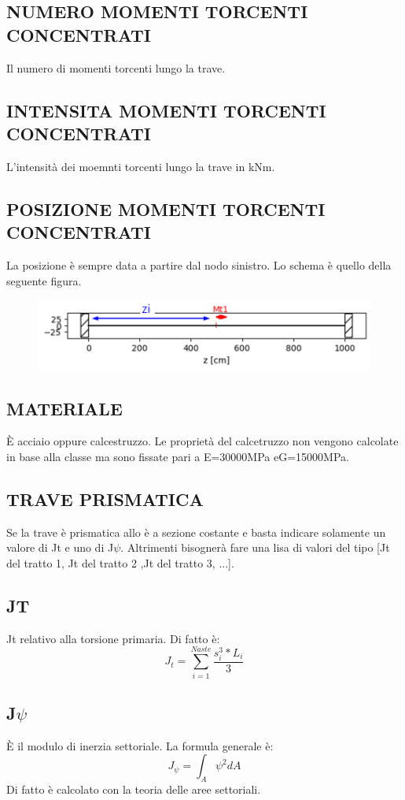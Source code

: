 \documentclass[12pt  , a4, titlepage]{article}
\newcommand{\E}{\`E }
\begin{document}
	\subsection*{NUMERO MOMENTI TORCENTI CONCENTRATI}
	Il numero di momenti torcenti lungo la trave.
	\subsection*{INTENSITA MOMENTI TORCENTI CONCENTRATI}
	L'intensità dei moemnti torcenti lungo la trave in kNm.
	\subsection*{POSIZIONE MOMENTI TORCENTI CONCENTRATI}
		La posizione è sempre data a partire dal nodo sinistro. Lo schema è quello della seguente figura.
		
			
		\begin{figure}[h!]
			\centering
			\includegraphics[width=\linewidth]{FIGURE/POSIZIONE CARICHI}
			\caption{}
			\label{fig:POSIZIONE CARICHI}
		\end{figure}
	
	\subsection*{MATERIALE}
	\E acciaio oppure calcestruzzo. Le proprietà del calcetruzzo non vengono calcolate in base alla classe ma sono fissate pari a E=30000MPa eG=15000MPa.
	
	\subsection*{TRAVE PRISMATICA}
	Se la trave è prismatica allo è a sezione costante e basta indicare solamente un valore di Jt e uno di J$\psi$. Altrimenti bisognerà fare una lisa di valori del tipo [Jt del tratto 1, Jt del tratto 2 ,Jt del tratto 3, ...].
	
	\subsection*{JT}
	Jt relativo alla torsione primaria. Di fatto è:
	\[
	J_t=\sum_{i=1}^{Naste}\frac{s_i^3*L_i}{3}
	\]
	\subsection*{J$\psi$}
	\E il modulo di inerzia settoriale. La formula generale è:
	\[
	J_{\psi} = \int_A \psi^2 dA
	\]
	Di fatto è calcolato con la teoria delle aree settoriali.
	
\end{document}

